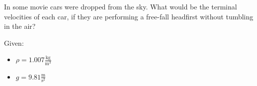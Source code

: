 
In some movie cars were dropped from the sky.
What would be the terminal velocities of each car, if they are
performing a free-fall headfirst without tumbling in the air?

\bigbreak Given:
\begin{itemize}
    \item $\rho = 1.007 \frac{\text{kg}}{\text{m}^3}$
    \item $ g = 9.81 \frac{\text{m}}{\text{s}^2} $
\end{itemize}
